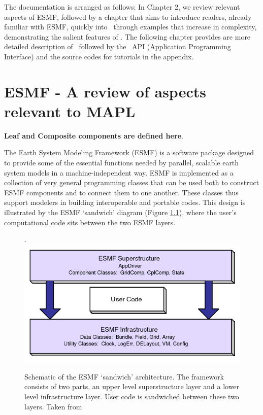 The documentation is arranged as follows: In Chapter 2, we review
relevant aspects of ESMF, followed by a chapter that aims to introduce
readers, already familiar with ESMF, quickly into \ggn\ through examples
that increase in complexity, demonstrating the salient features of \ggn.
The following chapter provides are more detailed description of \ggn\
followed by the \ggn\ API (Application Programming Interface) and the
source codes for tutorials in the appendix.


\chapter{ESMF - A review of aspects relevant to MAPL}
\minitoc

\textbf{Leaf and Composite components are defined here}.


The Earth System Modeling Framework (ESMF) \cite{deluca} is a
software package designed to provide some of the essential functions
needed by parallel, scalable earth system models in a
machine-independent way. ESMF is implemented as a collection of very
general programming classes that can be used both to construct ESMF
components and to connect them to one another.
These classes thus support modelers in
building interoperable and portable codes. This design is illustrated
by the ESMF `sandwich' diagram (Figure \ref{fig:esmf_sandwich}), where the
user's computational code sits between the two ESMF layers.
%
\begin{figure}[h]
  \label{fig:esmf_sandwich}
  \caption{Schematic of the ESMF `sandwich' architecture. The
    framework consists of two parts, an upper level superstructure
    layer and a lower level infrastructure layer. User code is
    sandwiched between these two layers. Taken from \cite{esmfManual}}.
  \centering
  \includegraphics[scale=0.7]{figs/esmf_sandwich.png}
\end{figure}
%

